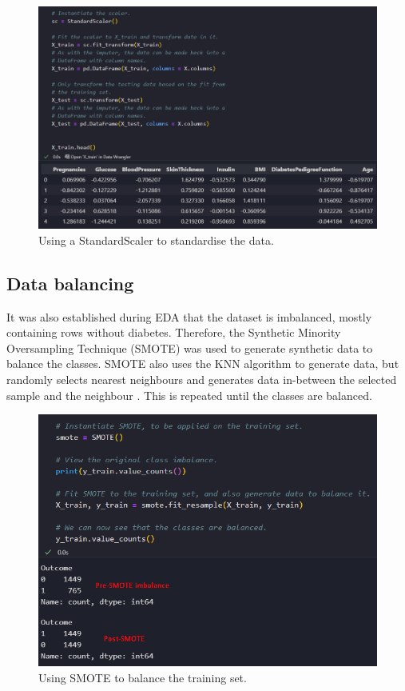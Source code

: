 \documentclass[12pt]{report}
\begin{document}
\begin{figure}[H]
    \centering
    \includegraphics[width=\linewidth]{Preprocessing/Standardisation.png}
    \caption{Using a StandardScaler to standardise the data.}
    \label{fig:Standardisation}
\end{figure}

\pagebreak

\subsection{Data balancing}
It was also established during EDA that the dataset is imbalanced, mostly containing rows without diabetes. Therefore,
the Synthetic Minority Oversampling Technique (SMOTE) was used to generate synthetic data to balance the classes. 
SMOTE also uses the KNN algorithm to generate data, but randomly selects nearest neighbours and generates data in-between
the selected sample and the neighbour \autocite{trainindata_overcoming_2023}. This is repeated until the classes are balanced.

\begin{figure}[H]
    \centering
    \includegraphics[width=.8\linewidth]{Preprocessing/SMOTE.png}
    \caption{Using SMOTE to balance the training set.}
    \label{fig:SMOTE}
\end{figure}
\end{document}
